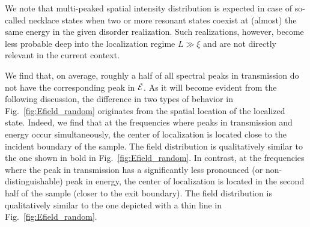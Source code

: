 We note that multi-peaked spatial intensity distribution is expected in case of so-called necklace states\cite{1987_Pendry,2005_Wiersma,2006_Genack_1d} when two or more resonant states coexist at (almost) the same energy in the given disorder realization. Such realizations, however, become less probable deep into the localization regime $L\gg\xi$ and  are not directly relevant in the current context. 

We find that, on average, roughly a half of all spectral peaks in transmission do not have the corresponding peak in $\tilde{\cal E}$. As it will become evident from the following discussion, the difference in two types of behavior in Fig.~\ref{fig:Efield_random} originates from the spatial location of the localized state. Indeed, we find that at the frequencies where peaks in transmission and energy occur simultaneously, the center of localization is located close to the incident boundary of the sample. The field distribution is qualitatively similar to the one shown in bold in Fig.~\ref{fig:Efield_random}. In contrast, at the frequencies where the peak in transmission has a significantly less pronounced (or non-distinguishable) peak in energy, the center of localization is located in the second half of the sample (closer to the exit boundary). The field distribution is qualitatively similar to the one depicted with a thin line in Fig.~\ref{fig:Efield_random}.\\

